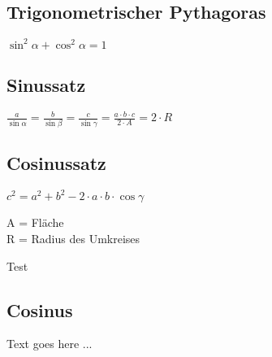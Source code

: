 \begin{sectionbox}

	\subsection{Trigonometrischer Pythagoras}
		\begin{emphbox}
			$ \sin ^2 \alpha + \cos ^2 \alpha = 1 $
		\end{emphbox}
		
	\subsection{Sinussatz}
		\begin{emphbox}
			$ \frac{a}{\sin \alpha} = \frac{b}{\sin \beta} = \frac{c}{\sin \gamma} = \frac{a \cdot b \cdot c}{2 \cdot A} = 2 \cdot R$
		\end{emphbox}

	\subsection{Cosinussatz}
		\begin{emphbox}
			$ c^2 = a^2 + b^2 - 2 \cdot a \cdot b \cdot \cos \gamma$
		\end{emphbox}

\begin{symbolbox}
	A = Fläche\\
	R = Radius des Umkreises
\end{symbolbox}

\begin{bluebox}
	Test
\end{bluebox}


\end{sectionbox}


\begin{sectionbox}
	\subsection{Cosinus}

	Text goes here ...


\end{sectionbox}


